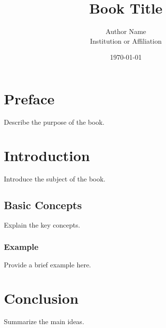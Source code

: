 \documentclass[11pt,a4paper]{book}
\title{Book Title}
\author{Author Name\\Institution or Affiliation}
\date{\today}
\begin{document}
\frontmatter
\maketitle
\tableofcontents

\chapter{Preface}
Describe the purpose of the book.

\mainmatter
\chapter{Introduction}
Introduce the subject of the book.

\section{Basic Concepts}
Explain the key concepts.

\subsection{Example}
Provide a brief example here.

\chapter{Conclusion}
Summarize the main ideas.
\end{document}
